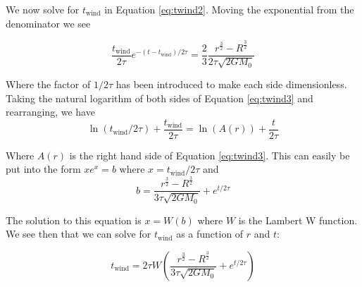 \documentclass[twocolumn]{aastex631}
\begin{document}
We now solve for $t_{\text{wind}}$ in Equation \ref{eq:twind2}.
Moving the exponential from the denominator we see

\begin{equation}
    \frac{t_{\text{wind}}}{2\tau} e^{-(t-t_{\text{wind}})/2\tau}
    = \frac{2}{3}
    \frac{r^{\frac{3}{2}} - R^{\frac{3}{2}}}
    {2\tau\sqrt{2 G M_0}}
    \label{eq:twind3}
\end{equation}

Where the factor of $1/2\tau$ has been introduced to make each side
dimensionless.
Taking the natural logarithm of both sides of Equation \ref{eq:twind3} 
and rearranging, we have
\begin{equation}
    \ln{(t_{\text{wind}}/2\tau)}
    + \frac{t_{\text{wind}}}{2\tau}
    = \ln{(A(r))} + \frac{t}{2\tau}
\end{equation}

Where $A(r)$ is the right hand side of Equation \ref{eq:twind3}.
This can easily be put into the form $xe^{x} = b$
where $x = t_{\text{wind}}/2\tau$
and
\[ b = \frac{r^{\frac{3}{2}} - R^{\frac{3}{2}}}
{3\tau\sqrt{2 G M_0}} + e^{t/2\tau} \]

The solution to this equation is $x = W(b)$ where $W$ is
the Lambert W function.
We see then that we can solve for $t_{\text{wind}}$ as
a function of $r$ and $t$:

\begin{equation}
    t_{\text{wind}} = 2\tau
    W\left(
        \frac{r^{\frac{3}{2}} - R^{\frac{3}{2}}}
        {3\tau\sqrt{2 G M_0}}
        + e^{t/2\tau}
    \right)
\end{equation}
\end{document}
